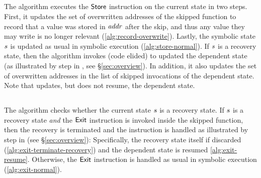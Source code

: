 \subsection{}

The algorithm executes the $\mathsf{Store}$ instruction on the
current state in two steps. First, it updates the set of overwritten
addresses of the skipped function to record that a value was stored in
$\mathit{addr}$ after the skip, and thus any value they may write is no longer
relevant (\cref{alg:record-overwrite}). Lastly, the symbolic state
$s$ is updated as usual in symbolic execution
(\cref{alg:store-normal}). If $s$ is a recovery state, then
the algorithm invokes
 (code elided) to
updated the dependent state (as illustrated by step  in
, see \S\ref{sec:overview}). In addition, it also
updates the set of overwritten addresses in the list of skipped
invocations of the dependent state. Note that
 updates, but
does not resume, the dependent state.

\subsection{}

The algorithm checks whether the current state $s$ is a
recovery state. If $s$ is a recovery state \emph{and} the
$\mathsf{Exit}$ instruction is invoked inside the skipped function,
then the recovery is terminated and the instruction is handled as
illustrated by step  in  (see
\S\ref{sec:overview}): Specifically, the recovery state itself if
discarded (\cref{alg:exit-terminate-recovery}) and the dependent state
is resumed \cref{alg:exit-resume}. Otherwise, the $\mathsf{Exit}$
instruction is handled as usual in symbolic execution
(\cref{alg:exit-normal}).


